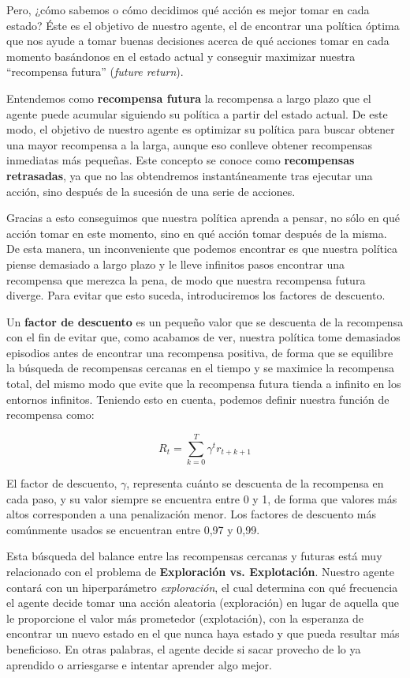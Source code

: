 Pero, ¿cómo sabemos o cómo decidimos qué acción es mejor tomar en cada estado? Éste es el objetivo de nuestro agente, el de encontrar una política óptima que nos ayude a tomar buenas decisiones acerca de qué acciones tomar en cada momento basándonos en el estado actual y conseguir maximizar nuestra “recompensa futura” (\textit{future return}).

Entendemos como \textbf{recompensa futura} la recompensa a largo plazo que el agente puede acumular siguiendo su política a partir del estado actual. De este modo, el objetivo de nuestro agente es optimizar su política para buscar obtener una mayor recompensa a la larga, aunque eso conlleve obtener recompensas inmediatas más pequeñas. Este concepto se conoce como \textbf{recompensas retrasadas}, ya que no las obtendremos instantáneamente tras ejecutar una acción, sino después de la sucesión de una serie de acciones.

Gracias a esto conseguimos que nuestra política aprenda a pensar, no sólo en qué acción tomar en este momento, sino en qué acción tomar después de la misma. De esta manera, un inconveniente que podemos encontrar es que nuestra política piense demasiado a largo plazo y le lleve infinitos pasos encontrar una recompensa que merezca la pena, de modo que nuestra recompensa futura diverge. Para evitar que esto suceda, introduciremos los factores de descuento.

Un \textbf{factor de descuento} es un pequeño valor que se descuenta de la recompensa con el fin de evitar que, como acabamos de ver, nuestra política tome demasiados episodios antes de encontrar una recompensa positiva, de forma que se equilibre la búsqueda de recompensas cercanas en el tiempo y se maximice la recompensa total, del mismo modo que evite que la recompensa futura tienda a infinito en los entornos infinitos. Teniendo esto en cuenta, podemos definir nuestra función de recompensa como:

$$R_{t} = \sum^{T}_{k = 0} \gamma^{t}r_{t + k + 1}$$

El factor de descuento, \( \gamma \), representa cuánto se descuenta de la recompensa en cada paso, y su valor siempre se encuentra entre 0 y 1, de forma que valores más altos corresponden a una penalización menor. Los factores de descuento más comúnmente usados se encuentran entre 0,97 y 0,99.

Esta búsqueda del balance entre las recompensas cercanas y futuras está muy relacionado con el problema de \textbf{Exploración vs. Explotación}. Nuestro agente contará con un hiperparámetro \textit{exploración}, el cual determina con qué frecuencia el agente decide tomar una acción aleatoria (exploración) en lugar de aquella que le proporcione el valor más prometedor (explotación), con la esperanza de encontrar un nuevo estado en el que nunca haya estado y que pueda resultar más beneficioso. En otras palabras, el agente decide si sacar provecho de lo ya aprendido o arriesgarse e intentar aprender algo mejor.

